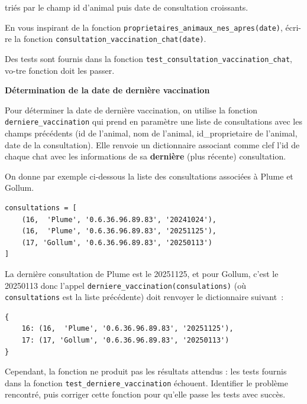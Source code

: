 \documentclass[a4paper,12pt]{article}
\begin{document}
triés par le champ id d’animal puis date de consultation croissants.

\begin{question}
    En vous inspirant de la fonction
    \verb|proprietaires_animaux_nes_apres(date)|, écri-re la fonction
    \verb|consultation_vaccination_chat(date)|.

    Des tests sont fournis dans la fonction
    \verb|test_consultation_vaccination_chat|, vo-tre fonction doit les passer.
\end{question}

\appel

\textbf{Détermination de la date de dernière vaccination}

Pour déterminer la date de dernière vaccination, on utilise la fonction
\verb|derniere_vaccination| qui prend en paramètre une liste de consultations
avec les champs précédents (id de l’animal, nom de l’animal, id\_proprietaire de
l’animal, date de la consultation). Elle renvoie un dictionnaire associant
comme clef l’id de chaque chat avec les informations de sa \textbf{dernière}
(plus récente) consultation.

On donne par exemple ci-dessous la liste des consultations associées à Plume et
Gollum.

\begin{verbatim}
consultations = [
    (16,  'Plume', '0.6.36.96.89.83', '20241024'),
    (16,  'Plume', '0.6.36.96.89.83', '20251125'),
    (17, 'Gollum', '0.6.36.96.89.83', '20250113') 
]   
\end{verbatim}

La dernière consultation de Plume est le 20251125, et pour Gollum, c’est le
20250113 donc l'appel \verb|derniere_vaccination(consulations)| (où
\verb|consultations| est la liste précédente) \newline doit renvoyer le
dictionnaire suivant :

\begin{verbatim}
{
    16: (16,  'Plume', '0.6.36.96.89.83', '20251125'),
    17: (17, 'Gollum', '0.6.36.96.89.83', '20250113')
}  
\end{verbatim}

\begin{question}
    Cependant, la fonction ne produit pas les résultats attendus : les tests
    fournis dans la fonction \verb|test_derniere_vaccination| échouent.
    Identifier le problème rencontré, puis corriger cette fonction pour qu’elle
    passe les tests avec succès.
\end{question}
\end{document}
